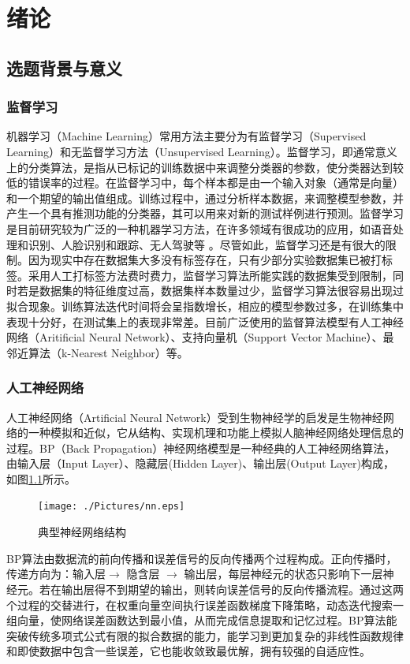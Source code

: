 \documentclass[oneside]{ZJUthesis}
\begin{document}
\mainmatter
\chapter{绪论}
\section{选题背景与意义}
\subsection{监督学习}
机器学习（Machine Learning）常用方法主要分为有监督学习（Supervised Learning）和无监督学习方法（Unsupervised Learning）。监督学习，即通常意义上的分类算法，是指从已标记的训练数据中来调整分类器的参数，使分类器达到较低的错误率的过程。在监督学习中，每个样本都是由一个输入对象（通常是向量）和一个期望的输出值组成。训练过程中，通过分析样本数据，来调整模型参数，并产生一个具有推测功能的分类器，其可以用来对新的测试样例进行预测。监督学习是目前研究较为广泛的一种机器学习方法，在许多领域有很成功的应用，如语音处理和识别、人脸识别和跟踪、无人驾驶等\cite{DBLP:journals/taslp/DahlYDA12,DBLP:conf/icml/Boulanger-LewandowskiBV12,DBLP:journals/neco/HintonOT06,DBLP:conf/nips/BengioLPL06,DBLP:conf/interspeech/YaoZHSY13,DBLP:conf/interspeech/MikolovKBCK10,DBLP:conf/emnlp/SocherPHNM11} 。尽管如此，监督学习还是有很大的限制。因为现实中存在数据集大多没有标签存在，只有少部分实验数据集已被打标签。采用人工打标签方法费时费力，监督学习算法所能实践的数据集受到限制，同时若是数据集的特征维度过高，数据集样本数量过少，监督学习算法很容易出现过拟合现象。训练算法迭代时间将会呈指数增长，相应的模型参数过多，在训练集中表现十分好，在测试集上的表现非常差。目前广泛使用的监督算法模型有人工神经网络（Aritificial Neural Network）、支持向量机（Support Vector Machine）、最邻近算法（k-Nearest Neighbor）等。


\subsection{人工神经网络}
人工神经网络（Artificial Neural Network）受到生物神经学的启发是生物神经网络的一种模拟和近似，它从结构、实现机理和功能上模拟人脑神经网络处理信息的过程。BP（Back Propagation）神经网络模型是一种经典的人工神经网络算法，由输入层（Input Layer）、隐藏层(Hidden Layer)、输出层(Output Layer)构成，如图\ref{fig:nn}所示。
\begin{figure}[h]
\centering
\texttt{[image: ./Pictures/nn.eps]}
\caption{典型神经网络结构\label{fig:nn}}
\end{figure}
BP算法由数据流的前向传播和误差信号的反向传播两个过程构成。正向传播时，传递方向为：输入层$\to$ 隐含层 $\to$ 输出层，每层神经元的状态只影响下一层神经元。若在输出层得不到期望的输出，则转向误差信号的反向传播流程。通过这两个过程的交替进行，在权重向量空间执行误差函数梯度下降策略，动态迭代搜索一组向量，使网络误差函数达到最小值，从而完成信息提取和记忆过程。BP算法能突破传统多项式公式有限的拟合数据的能力，能学习到更加复杂的非线性函数规律和即使数据中包含一些误差，它也能收敛致最优解，拥有较强的自适应性。
\end{document}
